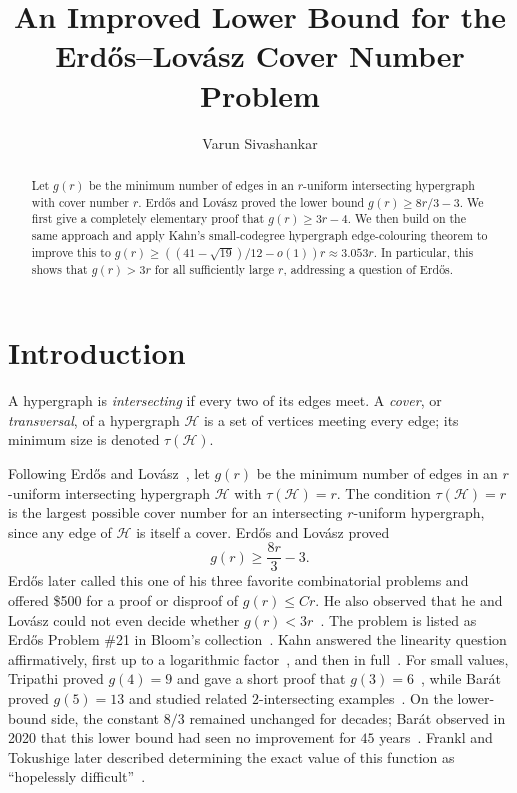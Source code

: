 \documentclass[11pt]{amsart}
\title{An Improved Lower Bound for the Erd\H{o}s--Lov\'asz Cover Number Problem}
\author{Varun Sivashankar}
\date{}
\theoremstyle{remark}
\newcommand{\cH}{\mathcal H}
\newcommand{\ta}{\tau}
\begin{document}
\begin{abstract}
Let $g(r)$ be the minimum number of edges in an $r$-uniform intersecting
hypergraph with cover number $r$.  Erd\H{o}s and Lov\'asz proved the lower
bound $g(r)\ge 8r/3-3$.  We first give a completely elementary proof that
$g(r)\ge 3r-4$.  We then build on the same approach and apply Kahn's
small-codegree hypergraph edge-colouring theorem to improve this to
$g(r)\ge ((41-\sqrt{19})/12-o(1))r\approx 3.053r$.  In
particular, this shows that $g(r)>3r$ for all sufficiently large $r$,
addressing a question of Erd\H{o}s.
\end{abstract}

\maketitle

\section{Introduction}

A hypergraph is \emph{intersecting} if every two of its edges meet.  A
\emph{cover}, or \emph{transversal}, of a hypergraph $\cH$ is a set of
vertices meeting every edge; its minimum size is denoted $\ta(\cH)$.

Following Erd\H{o}s and Lov\'asz~\cite{EL}, let $g(r)$ be the minimum number
of edges in an $r$-uniform intersecting hypergraph $\cH$ with $\ta(\cH)=r$.
The condition $\ta(\cH)=r$ is the largest possible cover number for an
intersecting $r$-uniform hypergraph, since any edge of $\cH$ is itself a
cover.  Erd\H{o}s and Lov\'asz proved
\[
  g(r)\ge \frac{8r}{3}-3.
\]
Erd\H{o}s later called this one of his three favorite combinatorial problems
and offered \$500 for a proof or disproof of $g(r)\le Cr$.  He also observed
that he and Lov\'asz could not even decide whether
$g(r)<3r$~\cite{ErdosFavorite}.  The problem is listed as Erd\H{o}s
Problem \#21 in Bloom's
collection~\cite{BloomProblem21}.  Kahn answered the
linearity question affirmatively, first up to a logarithmic
factor~\cite{KahnELI}, and then in full~\cite{KahnELII}.  For
small values, Tripathi proved $g(4)=9$ and gave a short proof that
$g(3)=6$~\cite{Tripathi}, while Bar\'at proved $g(5)=13$ and studied
related $2$-intersecting examples~\cite{Barat}.  On the lower-bound side, the
constant $8/3$ remained unchanged for decades; Bar\'at
observed in 2020 that this lower bound had seen no improvement for $45$
years~\cite{Barat}.  Frankl and Tokushige later described determining the
exact value of this function as ``hopelessly difficult''~\cite{FranklTokushigeSurvey}.
\end{document}
